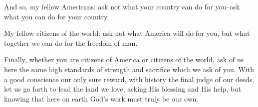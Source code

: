 \documentclass[10pt,a4paper]{article}
\begin{document}
And so, my fellow Americans: ask not what your country can do for you--ask what you can do for your country.

My fellow citizens of the world: ask not what America will do for you, but what together we can do for the freedom of man.

Finally, whether you are citizens of America or citizens of the world, ask of us here the same high standards of strength and sacrifice which we ask of you. With a good conscience our only sure reward, with history the final judge of our deeds, let us go forth to lead the land we love, asking His blessing and His help, but knowing that here on earth God's work must truly be our own.
\end{document}
